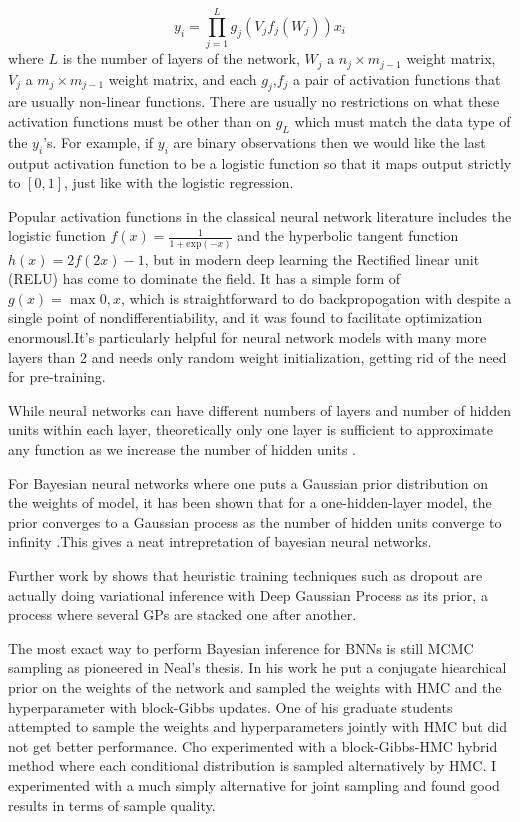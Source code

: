 \documentclass[12pt]{report}
\begin{document}
\[y_i = \prod_{j=1}^Lg_j(V_jf_j(W_j))x_i \]
where $L$ is the number of layers of the network, $W_j$ a $n_j \times m_{j-1}$
weight matrix, $V_j$ a $m_j \times m_{j-1}$ weight matrix, and each $g_j$,$f_j$
a pair of activation functions that are usually non-linear functions. There are
usually no restrictions on what these activation functions must be other than on
$g_L$ which must match the data type of the $y_i$'s. For example, if $y_i$ are
binary observations then we would like the last output activation function to be a
logistic function so that it maps output strictly to $[0,1]$, just like with the
logistic regression.

Popular activation functions in the classical neural network literature includes
the logistic function $f(x) = \frac{1}{1+\text{exp}(-x)} $ and the hyperbolic tangent function $h(x) =  2f(2x)-1$, but in modern deep
learning the Rectified linear unit (RELU) has come to dominate the field. It has
a simple form of $g(x)=\max{0,x}$, which is straightforward to do
backpropogation with despite a single point of nondifferentiability, and it was
found to facilitate optimization enormousl.It's particularly helpful for
neural network models with many more layers than 2 and needs only random weight initialization, getting rid of the need for pre-training. 

While neural networks can have different numbers of layers and number of hidden
units within each layer, theoretically only one layer is sufficient to
approximate any function as we increase the number of hidden units \cite{hornik1991approximation}. 

For Bayesian neural networks where one puts a Gaussian prior distribution on the weights of model, it has been shown that for a one-hidden-layer model, the prior converges to a Gaussian process as the number of hidden units converge to infinity \cite{neal2012bayesian}.This gives a neat intrepretation of bayesian neural networks. 

Further work by \cite{gal2015dropout} shows that heuristic training techniques such as dropout \cite{srivastava2014dropout}  are actually doing variational inference with Deep Gaussian Process \cite{damianou2013deep} as its prior, a process where several GPs are stacked one after another. 

The most exact way to perform Bayesian inference for BNNs is still MCMC sampling as pioneered in Neal's thesis. In his work he put a conjugate hiearchical prior on the weights of the network and sampled the weights with HMC and the hyperparameter with block-Gibbs updates. One of his graduate students attempted to sample the weights and hyperparameters jointly with HMC but did not get better performance. Cho \cite{choo2000learning} experimented with a block-Gibbs-HMC hybrid method where each conditional distribution is sampled alternatively by HMC. I experimented with a much simply alternative for joint sampling and found good results in terms of sample quality. 
\end{document}
